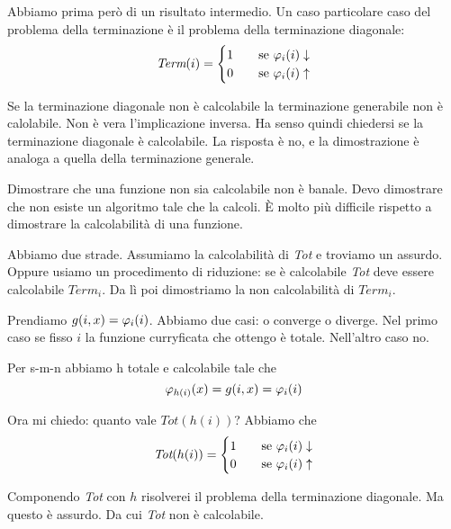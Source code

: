 Abbiamo prima però di un risultato intermedio. Un caso particolare caso del problema della
terminazione è il problema della terminazione diagonale:
\begin{equation*}
    \textit{Term}(i) =
    \begin{cases}
        1 \quad &\text{se $\varphi_{i}(i) \downarrow$} \\
        0 \quad &\text{se $\varphi_{i}(i) \uparrow$} \\
    \end{cases}
\end{equation*}

Se la terminazione diagonale non è calcolabile la terminazione generabile non è calolabile. Non è
vera l'implicazione inversa. Ha senso quindi chiedersi se la terminazione diagonale è calcolabile.
La risposta è no, e la dimostrazione è analoga a quella della terminazione generale.

Dimostrare che una funzione non sia calcolabile non è banale. Devo dimostrare che non esiste un
algoritmo tale che la calcoli. È molto più difficile rispetto a dimostrare la calcolabilità di una
funzione.

Abbiamo due strade. Assumiamo la calcolabilità di \textit{Tot} e troviamo un assurdo. Oppure usiamo
un procedimento di riduzione: se è calcolabile \textit{Tot} deve essere calcolabile
$\textit{Term}_{i}$. Da lì poi dimostriamo la non calcolabilità di $\textit{Term}_{i}$.

Prendiamo $g(i,x) = \varphi_{i}(i)$. Abbiamo due casi: o converge o diverge. Nel primo caso se fisso $i$
la funzione curryficata che ottengo è totale. Nell'altro caso no.

Per s-m-n abbiamo h totale e calcolabile tale che
\begin{equation*}
    \varphi_{h(i)}(x) = g(i,x) = \varphi_{i}(i)
\end{equation*}

Ora mi chiedo: quanto vale $\textit{Tot}(h(i))$? Abbiamo che
\begin{equation*}
    \textit{Tot}(h(i))=
    \begin{cases}
        1 \quad &\text{se $\varphi_{i}(i) \downarrow$} \\
        0 \quad &\text{se $\varphi_{i}(i) \uparrow$}
    \end{cases}
\end{equation*}

Componendo \textit{Tot} con $h$ risolverei il problema della terminazione diagonale. Ma questo è
assurdo. Da cui \textit{Tot} non è calcolabile.

